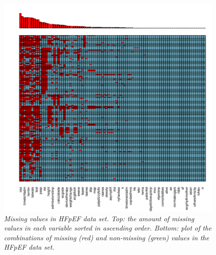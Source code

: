 \documentclass[../thesis.tex]{subfiles}
\begin{document}
\begin{figure}[h!]
    \centering
    \hspace*{-1cm}\includegraphics[width=1.1\textwidth]{doc/thesis/images/HFpEF_miss_dist.pdf}
    \caption[Missing values in HFpEF data set]{\textit{Missing values in HFpEF data set. Top:  the amount of missing values in each variable sorted in ascending order. Bottom: plot of the combinations of missing (red) and non-missing (green) values in the HFpEF data set.}}
    \label{fig:HFpEF_missing}
\end{figure}

\newpage
\end{document}
